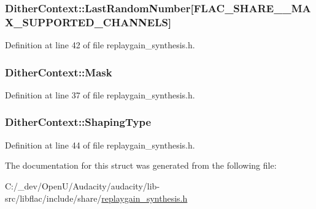 \subsubsection[{\texorpdfstring{Last\+Random\+Number}{LastRandomNumber}}]{ Dither\+Context\+::\+Last\+Random\+Number\mbox{[}{\bf F\+L\+A\+C\+\_\+\+S\+H\+A\+R\+E\+\_\+\+\_\+\+M\+A\+X\+\_\+\+S\+U\+P\+P\+O\+R\+T\+E\+D\+\_\+\+C\+H\+A\+N\+N\+E\+LS}\mbox{]}}\hypertarget{struct_dither_context_a52d31acfd4fb1eb880bca836b70aafcd}{}\label{struct_dither_context_a52d31acfd4fb1eb880bca836b70aafcd}


Definition at line 42 of file replaygain\+\_\+synthesis.\+h.

\subsubsection[{\texorpdfstring{Mask}{Mask}}]{ Dither\+Context\+::\+Mask}\hypertarget{struct_dither_context_abb09fde51b8472ec21274b4fa595c132}{}\label{struct_dither_context_abb09fde51b8472ec21274b4fa595c132}


Definition at line 37 of file replaygain\+\_\+synthesis.\+h.

\subsubsection[{\texorpdfstring{Shaping\+Type}{ShapingType}}]{ Dither\+Context\+::\+Shaping\+Type}\hypertarget{struct_dither_context_a45c49e20d4990b7a1942eab165c90f61}{}\label{struct_dither_context_a45c49e20d4990b7a1942eab165c90f61}


Definition at line 44 of file replaygain\+\_\+synthesis.\+h.



The documentation for this struct was generated from the following file\+:\begin{DoxyCompactItemize}
\item 
C\+:/\+\_\+dev/\+Open\+U/\+Audacity/audacity/lib-\/src/libflac/include/share/\hyperlink{replaygain__synthesis_8h}{replaygain\+\_\+synthesis.\+h}\end{DoxyCompactItemize}

